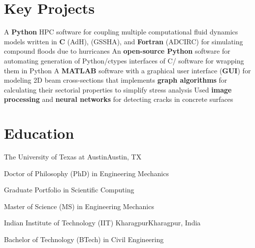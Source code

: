 \documentclass[letterpaper,10pt]{article}
\begin{document}
  \resumeSubHeadingListEnd

\section{Key Projects}
  \resumeSubItemListStart
      {A \textbf{Python} HPC software for coupling multiple computational fluid
      dynamics models written in \textbf{C} (AdH), \textbf{\CC{}} (GSSHA), and
      \textbf{Fortran} (ADCIRC) for simulating compound floods due to hurricanes}
      {An \textbf{open-source Python} software for automating
      generation of Python/ctypes interfaces of C/\CC{} software for wrapping
      them in Python}
      {A \textbf{MATLAB} software with a graphical user interface (\textbf{GUI})
      for modeling 2D beam cross-sections that implements \textbf{graph
      algorithms} for calculating their sectorial properties to simplify stress
      analysis}
      {Used \textbf{image processing} and \textbf{neural networks} for detecting
      cracks in concrete surfaces}
  \resumeSubItemListEnd

\section{Education}
  \resumeSubHeadingListStart

    \resumeSubheading
      {The University of Texas at Austin}{Austin, TX}

      \resumeSubSubheading
        {Doctor of Philosophy (PhD) in Engineering Mechanics}{}

      \resumeSubSubheading
        {Graduate Portfolio in Scientific Computing}{}

      \resumeSubSubheading
        {Master of Science (MS) in Engineering Mechanics}{}

    \resumeSubheading
      {Indian Institute of Technology (IIT) Kharagpur}{Kharagpur, India}

      \resumeSubSubheading
        {Bachelor of Technology (BTech) in Civil Engineering}{}

  \resumeSubHeadingListEnd
\end{document}
